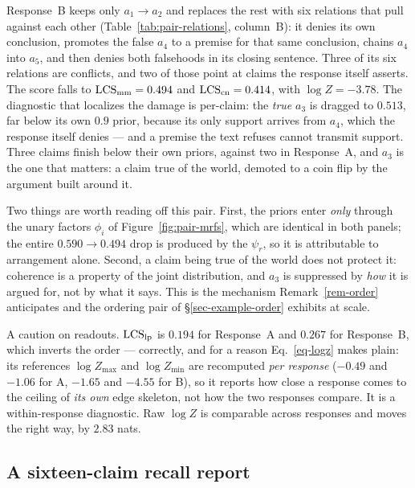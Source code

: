 \begin{example}[Incoherent]
\label{ex-pair-incoherent}
Response~B keeps only $a_1\!\to\!a_2$ and replaces the rest with six relations that pull against each
other (Table~\ref{tab:pair-relations}, column~B): it denies its own conclusion, promotes the false
$a_4$ to a premise for that same conclusion, chains $a_4$ into $a_5$, and then denies both
falsehoods in its closing sentence. Three of its six relations are conflicts, and two of those point
at claims the response itself asserts. The score falls to $\mathrm{LCS}_{\mathrm{mm}}=0.494$ and $\mathrm{LCS}_{\mathrm{cn}}=0.414$, with $\log Z=-3.78$. The diagnostic that
localizes the damage is per-claim: the \emph{true} $a_3$ is dragged to $0.513$, far below its own
$0.9$ prior, because its only support arrives from $a_4$, which the response itself denies --- and a
premise the text refuses cannot transmit support. Three claims finish below their own priors,
against two in Response~A, and $a_3$ is the one that matters: a claim true of the world, demoted to
a coin flip by the argument built around it.
\end{example}

Two things are worth reading off this pair. First, the priors enter \emph{only} through the unary
factors $\phi_i$ of Figure~\ref{fig:pair-mrfs}, which are identical in both panels; the entire
$0.590\to0.494$ drop is produced by the $\psi_r$, so it is attributable to arrangement alone.
Second, a claim being true of the world does not protect it: coherence is a property of the joint
distribution, and $a_3$ is suppressed by \emph{how} it is argued for, not by what it says. This is
the mechanism Remark~\ref{rem-order} anticipates and the ordering pair of
\S\ref{sec-example-order} exhibits at scale.

A caution on readouts. $\mathrm{LCS}_{\mathrm{lp}}$ is $0.194$ for Response~A and $0.267$ for Response~B, which
inverts the order --- correctly, and for a reason Eq.~\ref{eq-logz} makes plain: its references
$\log Z_{\max}$ and $\log Z_{\min}$ are recomputed \emph{per response} ($-0.49$ and $-1.06$ for A,
$-1.65$ and $-4.55$ for B), so it reports how close a response comes to the ceiling of \emph{its
own} edge skeleton, not how the two responses compare. It is a within-response diagnostic. Raw
$\log Z$ is comparable across responses and moves the right way, by $2.83$ nats.

\subsection{A sixteen-claim recall report}
\label{sec-example-aero}

